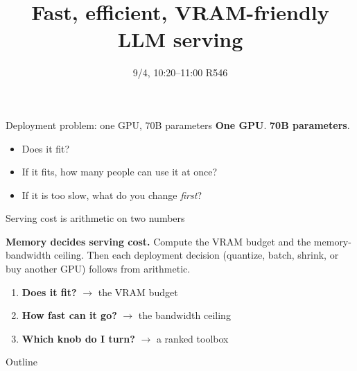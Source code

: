 \documentclass[aspectratio=169,10pt]{beamer}
\title{Fast, efficient, VRAM-friendly LLM serving}
\author{\CJK{仲翊}{Chung-Yi}}
\institute{MiRA Training Course 2026}
\date{9/4, 10:20--11:00 \quad R546}
\newcommand{\emphc}[1]{\textcolor{accent}{\textbf{#1}}}
\begin{document}
\maketitle
{}

\begin{frame}{Deployment problem: one GPU, 70B parameters}
  \vspace{0.5em}
  \emphc{One GPU}. \emphc{70B parameters}.
  \begin{itemize}
    \item Does it fit?
    \item If it fits, how many people can use it at once?
    \item If it is too slow, what do you change \emph{first}?
  \end{itemize}
  \vspace{0.6em}
\end{frame}

\begin{frame}{Serving cost is arithmetic on two numbers}
  \begin{alertblock}{}
    \textbf{Memory decides serving cost.}
    Compute the VRAM budget and the memory-bandwidth ceiling. Then each
    deployment decision (quantize, batch, shrink, or buy another GPU)
    follows from arithmetic.
  \end{alertblock}
  \vspace{0.4em}
  \begin{enumerate}
    \item \textbf{Does it fit?} $\rightarrow$ the VRAM budget
    \item \textbf{How fast can it go?} $\rightarrow$ the bandwidth ceiling
    \item \textbf{Which knob do I turn?} $\rightarrow$ a ranked toolbox
  \end{enumerate}
\end{frame}

\begin{frame}{Outline}
  \tableofcontents
\end{frame}
\end{document}
